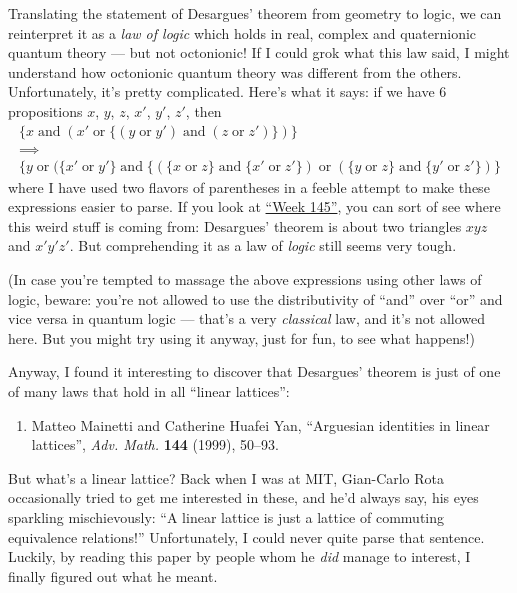 \documentclass{article}
\def\tightlist{}
\begin{document}
Translating the statement of Desargues' theorem from geometry to logic,
we can reinterpret it as a \emph{law of logic} which holds in real,
complex and quaternionic quantum theory --- but not octonionic! If I
could grok what this law said, I might understand how octonionic quantum
theory was different from the others. Unfortunately, it's pretty
complicated. Here's what it says: if we have 6 propositions \(x\),
\(y\), \(z\), \(x'\), \(y'\), \(z'\), then \[
  \begin{gathered}
    \{x \operatorname{and} (x' \operatorname{or} \{(y \operatorname{or} y') \operatorname{and} (z \operatorname{or} z')\})\}
  \\\implies
  \\\{y \operatorname{or} (\{x' \operatorname{or} y'\} \operatorname{and} \{(\{x \operatorname{or} z\} \operatorname{and} \{x' \operatorname{or} z'\}) \operatorname{or} (\{y \operatorname{or} z\} \operatorname{and} \{y' \operatorname{or} z'\}) \}
  \end{gathered}
\] where I have used two flavors of parentheses in a feeble attempt to
make these expressions easier to parse. If you look at
\protect\hyperlink{week145}{``Week 145''}, you can sort of see where
this weird stuff is coming from: Desargues' theorem is about two
triangles \(xyz\) and \(x'y'z'\). But comprehending it as a law of
\emph{logic} still seems very tough.

(In case you're tempted to massage the above expressions using other
laws of logic, beware: you're not allowed to use the distributivity of
``and'' over ``or'' and vice versa in quantum logic --- that's a very
\emph{classical} law, and it's not allowed here. But you might try using
it anyway, just for fun, to see what happens!)

Anyway, I found it interesting to discover that Desargues' theorem is
just of one of many laws that hold in all ``linear lattices'':

\begin{enumerate}
\def\labelenumi{\arabic{enumi})}
\setcounter{enumi}{2}
\tightlist
\item
  Matteo Mainetti and Catherine Huafei Yan, ``Arguesian identities in
  linear lattices'', \emph{Adv. Math.} \textbf{144} (1999), 50--93.
\end{enumerate}

But what's a linear lattice? Back when I was at MIT, Gian-Carlo Rota
occasionally tried to get me interested in these, and he'd always say,
his eyes sparkling mischievously: ``A linear lattice is just a lattice
of commuting equivalence relations!'' Unfortunately, I could never quite
parse that sentence. Luckily, by reading this paper by people whom he
\emph{did} manage to interest, I finally figured out what he meant.
\end{document}

